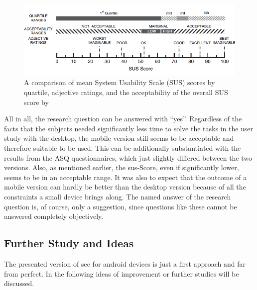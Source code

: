 \begin{figure}[htb]
    \centering
    \includegraphics[width=1\textwidth]{Conclusion/img/sus.png}
    \caption{A comparison of mean System Usability Scale (SUS) scores by quartile,
    adjective ratings, and the acceptability of the overall SUS score by \cite{doi:10.1080/10447310802205776}}\label{fig:sus_scale}
  \end{figure}

  All in all, the research question can be answered with \enquote{yes}.
  Regardless of the facts that the subjects needed significantly less time to solve the tasks in the user study with the desktop, the mobile version still seems to be acceptable and therefore suitable to be used.
  This can be additionally substantiated with the results from the \gls{ASQ} questionnaires, which just slightly differed between the two versions.
  Also, as mentioned earlier, the \gls{sus}-Score, even if significantly lower, seems to be in an acceptable range.
  It was also to expect that the outcome of a mobile version can hardly be better than the desktop version because of all the constraints a small device brings along.
  The named answer of the research question is, of course, only a suggestion, since questions like these cannot be answered completely objectively.

\subsection{Further Study and Ideas}
The presented version of \gls{see} for \gls{android} devices is just a first approach and far from perfect. 
In the following ideas of improvement or further studies will be discussed.

